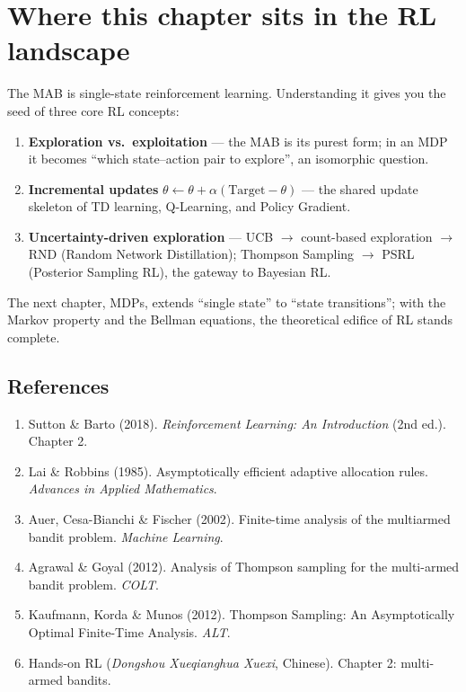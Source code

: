 \documentclass{article}
\begin{document}
\section*{Where this chapter sits in the RL landscape}

The MAB is single-state reinforcement learning. Understanding it gives you the seed of three core RL concepts:

\begin{enumerate}
  \item \textbf{Exploration vs.\ exploitation} --- the MAB is its purest form; in an MDP it becomes ``which state--action pair to explore'', an isomorphic question.
  \item \textbf{Incremental updates} $\theta \leftarrow \theta + \alpha(\text{Target} - \theta)$ --- the shared update skeleton of TD learning, Q-Learning, and Policy Gradient.
  \item \textbf{Uncertainty-driven exploration} --- UCB $\to$ count-based exploration $\to$ RND (Random Network Distillation); Thompson Sampling $\to$ PSRL (Posterior Sampling RL), the gateway to Bayesian RL.
\end{enumerate}

The next chapter, MDPs, extends ``single state'' to ``state transitions''; with the Markov property and the Bellman equations, the theoretical edifice of RL stands complete.

\subsection*{References}

\begin{enumerate}
  \item Sutton \& Barto (2018). \textit{Reinforcement Learning: An Introduction} (2nd ed.). Chapter 2.
  \item Lai \& Robbins (1985). Asymptotically efficient adaptive allocation rules. \textit{Advances in Applied Mathematics}.
  \item Auer, Cesa-Bianchi \& Fischer (2002). Finite-time analysis of the multiarmed bandit problem. \textit{Machine Learning}.
  \item Agrawal \& Goyal (2012). Analysis of Thompson sampling for the multi-armed bandit problem. \textit{COLT}.
  \item Kaufmann, Korda \& Munos (2012). Thompson Sampling: An Asymptotically Optimal Finite-Time Analysis. \textit{ALT}.
  \item Hands-on RL (\textit{Dongshou Xueqianghua Xuexi}, Chinese). Chapter 2: multi-armed bandits.
\end{enumerate}
\end{document}
